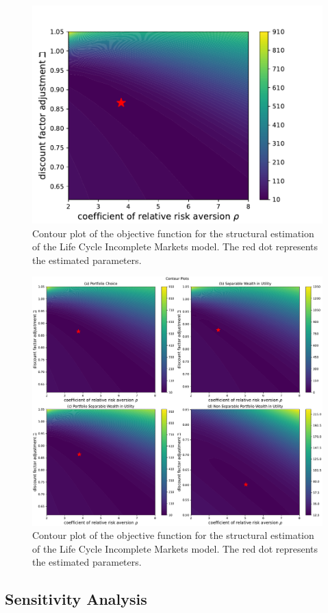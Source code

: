 \documentclass{article}
\begin{document}
\begin{figure}[!htbp]
\centering
\includegraphics[width=0.7\linewidth]{files/IndShockSMMcontour-f950f8faf8926e47605d36d01964a2f6.pdf}
\caption{Contour plot of the objective function for the structural estimation of the Life Cycle Incomplete Markets model. The red dot represents the estimated parameters.}
\label{fig:IndShockSMMcontour}
\end{figure}

\begin{figure}[!htbp]
\centering
\includegraphics[width=0.7\linewidth]{files/AllSMMcontour-61083533183861c53042688308f7803e.pdf}
\caption{Contour plot of the objective function for the structural estimation of the Life Cycle Incomplete Markets model. The red dot represents the estimated parameters.}
\label{fig:AllSMMcontour}
\end{figure}

\subsection{Sensitivity Analysis}\label{Sensitivity Analysis}
\end{document}

